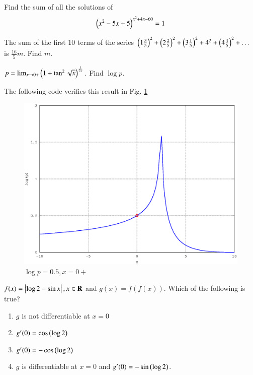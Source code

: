 \documentclass[journal,12pt,twocolumn]{IEEEtran}
\begin{document}
%
\begin{problem}
Find the sum of all the solutions of 
\begin{equation*}
\left(x^2-5x+5\right)^{x^2+4x-60}=1
\end{equation*}
\end{problem}
\solution


%
\begin{problem}
The sum of the first 10 terms of the series $\left(1\frac{3}{5}\right)^2+\left(2\frac{2}{5}\right)^2+\left(3\frac{1}{5}\right)^2+4^2+\left(4\frac{4}{5}\right)^2 + \dots $ is $\frac{16}{5}m$.  Find $m$.
\end{problem}
\solution


%
\begin{problem}
$p = \lim_{x \rightarrow 0+}\left(1+\tan^2\sqrt{x}\right)^{\frac{1}{2x}}$. Find  $\log p$.
\end{problem}
\solution 

The following code verifies this result in Fig. \ref{fig_29}

%
\begin{figure}[h]
\centering
\includegraphics[width=\columnwidth]{./version_2/ee16b1029/ee16b1029}
\caption{ $\log p = 0.5, x = 0+$}
\label{fig_29}	
\end{figure}
%
\begin{problem}
$f(x) = \left\vert\log 2 - \sin x\right\vert, x \in \mathbf{R}$ and $g(x)=f(f(x))$.  Which of the following is true?
\begin{enumerate}
\item $g$ is not differentiable at $x=0$
\item $g^{\prime}(0) = \cos \left(\log 2\right)$
\item $g^{\prime}(0) = -\cos \left(\log 2\right)$
\item $g$ is differentiable at $x=0$ and $g^{\prime }(0) = -\sin \left(\log 2\right)$.
\end{enumerate}
\end{problem}
\end{document}
